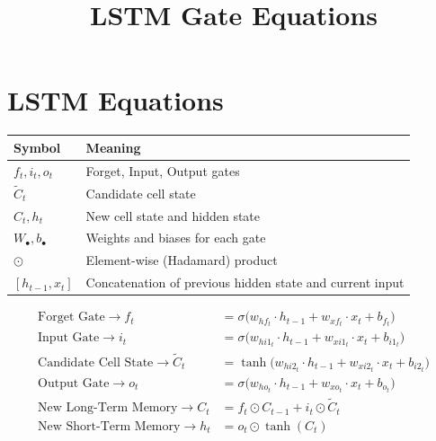 \documentclass[12pt]{article}
\begin{document}
\title{LSTM Gate Equations}
\author{}
\date{}
\maketitle

\section*{LSTM Equations}

\begin{center}
\begin{tabular}{@{}ll@{}}
\toprule
\textbf{Symbol}              & \textbf{Meaning} \\
\midrule
\( f_t, i_t, o_t \)          & Forget, Input, Output gates \\
\( \tilde{C}_t \)            & Candidate cell state \\
\( C_t, h_t \)               & New cell state and hidden state \\
\( W_\bullet, b_\bullet \)   & Weights and biases for each gate \\
\( \odot \)                  & Element-wise (Hadamard) product \\
\( [h_{t-1}, x_t] \)         & Concatenation of previous hidden state and current input \\
\bottomrule
\end{tabular}
\end{center}


\begin{align}
\text{Forget Gate} \to f_t &= \sigma \bigl( w_{hf_t} \cdot h_{t-1} + w_{xf_t} \cdot x_t + b_{f_t} \bigr) \label{eq:forget} \\[4pt]
\text{Input Gate} \to i_t &= \sigma \bigl( w_{hi1_t} \cdot h_{t-1} + w_{xi1_t} \cdot x_t + b_{i1_t} \bigr) \label{eq:input} \\
\text{Candidate Cell State} \to \tilde{C}_t &= \tanh \bigl( w_{hi2_t} \cdot h_{t-1} + w_{xi2_t} \cdot x_t + b_{i2_t} \bigr) \label{eq:candidate} \\[4pt]
\text{Output Gate} \to o_t &= \sigma \bigl( w_{ho_t} \cdot h_{t-1} + w_{xo_t} \cdot x_t + b_{o_t} \bigr) \label{eq:output} \\[8pt]
\text{New Long-Term Memory} \to C_t &= f_t \odot C_{t-1} + i_t \odot \tilde{C}_t \label{eq:cell} \\
\text{New Short-Term Memory} \to h_t &= o_t \odot \tanh(C_t) \label{eq:hidden}
\end{align}
\end{document}
